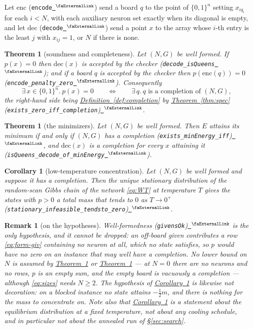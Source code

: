 \documentclass{easychair}
\newtheorem{theorem}[thm]{Theorem}
\newtheorem{corollary}[thm]{Corollary}
\newtheorem{remark}[thm]{Remark}
\newcommand{\secref}[1]{\hyperref[#1]{\textcolor{academicpurple}{\S\ref*{#1}}}}
\newcommand{\thmref}[1]{\textcolor{academicpurple}{\hyperref[#1]{Theorem~\ref*{#1}}}}
\newcommand{\corref}[1]{\textcolor{academicpurple}{\hyperref[#1]{Corollary~\ref*{#1}}}}
\newcommand{\defref}[1]{\textcolor{academicpurple}{\hyperref[#1]{Definition~\ref*{#1}}}}
\newcommand{\extlink}{~\ensuremath{{}^\text{\faExternalLink}}}
\newcommand{\repoowner}{mkaratarakis/HNBM}
\newcommand{\reporef}{1bd91612ee31180f6c99fa11090b713f3012ead4}
\newcommand{\repo}{https://github.com/\repoowner/blob/\reporef}
\newcommand{\srcl}[2]{\href{\repo/#1\#L#2}{\extlink}}
\newcommand{\qsrc}[2]{\srcl{HopfieldNet/QUBO/Instances/Queens/#1}{#2}}
\newcommand{\qusrc}[2]{\srcl{HopfieldNet/QUBO/#1}{#2}}
\begin{document}
Let $\mathrm{enc}$ (\lstinline{encode}\qsrc{Basic.lean}{935}) send a board $q$ to the point of
$\{0,1\}^{n}$ setting $x_{i q_i}$ for each $i < N$, with each auxiliary neuron set exactly when its
diagonal is empty, and let $\mathrm{dec}$ (\lstinline{decode}\qsrc{Basic.lean}{605}) send a point $x$
to the array whose $i$-th entry is the least $j$ with $x_{ij} = 1$, or $N$ if there is none.

\begin{theorem}[soundness and completeness]\label{thm:iff}
Let $(N,G)$ be well formed. If $p(x) = 0$ then $\mathrm{dec}(x)$ is accepted by the checker
(\lstinline{decode_isQueens}\qsrc{Basic.lean}{909}); and if a board $q$ is accepted by the checker then
$p(\mathrm{enc}(q)) = 0$ (\lstinline{encode_penalty_zero}\qsrc{Basic.lean}{1179}). Consequently
\[
  \exists\, x \in \{0,1\}^{n}.\ p(x) = 0
  \qquad\Longleftrightarrow\qquad
  \exists\, q.\ q \text{ is a completion of } (N,G),
\]
the right-hand side being \defref{def:completion} by \thmref{thm:spec}
(\lstinline{exists_zero_iff_completion})\qsrc{Spec.lean}{76}.
\end{theorem}

\begin{theorem}[the minimizers]\label{thm:min}
Let $(N,G)$ be well formed. Then $E$ attains its minimum if and only if $(N,G)$ has a completion
(\lstinline{exists_minEnergy_iff})\qsrc{Converge.lean}{139},
and $\mathrm{dec}(x)$ is a completion for every $x$ attaining it
(\lstinline{isQueens_decode_of_minEnergy}\qsrc{Converge.lean}{130}).
\end{theorem}

\begin{corollary}[low-temperature concentration]\label{cor:gibbs}
Let $(N,G)$ be well formed and suppose it has a completion. Then the unique stationary distribution
of the random-scan Gibbs chain of the network \eqref{eq:WT} at temperature $T$ gives the states with
$p > 0$ a total mass that tends to $0$ as $T \to 0^{+}$
(\lstinline{stationary_infeasible_tendsto_zero})\qusrc{Gibbs.lean}{365}.
\end{corollary}

\begin{remark}[on the hypotheses]\label{rem:hyp}
Well-formedness (\lstinline{givensOk})\qsrc{Basic.lean}{626} is the only hypothesis, and it cannot be
dropped: an off-board given contributes a
row \eqref{eq:form-giv} containing no neuron at all, which no state satisfies, so $p$ would have no
zero on an instance that may well have a completion. No lower bound on $N$ is assumed by
\thmref{thm:iff} or \thmref{thm:min} --- at $N = 0$ there are no neurons and no rows, $p$ is an
empty sum, and the empty board is vacuously a completion --- although \eqref{eq:sizes} needs
$N \ge 2$. The hypothesis of \corref{cor:gibbs} is likewise not decoration: on a blocked instance no
state attains $-\tfrac12 m$, and there is nothing for the mass to concentrate on. Note also that
\corref{cor:gibbs} is a statement about the equilibrium distribution at a fixed temperature, not
about any cooling schedule, and in particular not about the annealed run of \secref{sec:search}.
\end{remark}
\end{document}
